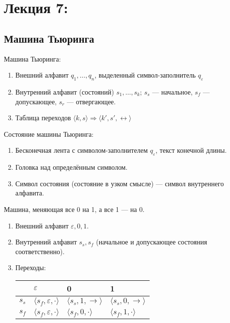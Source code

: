 \section{Лекция 7:}

\subsection{Машина Тьюринга}

 Машина Тьюринга:
\begin{enumerate}
\item Внешний алфавит $q_1, \dots, q_n$, выделенный символ-заполнитель $q_\varepsilon$
\item Внутренний алфавит (состояний) $s_1, \dots, s_k$; $s_s$ --- начальное, $s_f$ --- допускающее, $s_r$ --- отвергающее.
\item Таблица переходов $\langle k, s \rangle \Rightarrow \langle k', s', \leftrightarrow \rangle$
\end{enumerate}

 Состояние машины Тьюринга:
\begin{enumerate}
\item Бесконечная лента с символом-заполнителем $q_\varepsilon$, текст конечной длины.
\item Головка над определённым символом.
\item Символ состояния (состояние в узком смысле) --- символ внутреннего алфавита.
\end{enumerate}

Машина, меняющая все 0 на 1, а все 1 --- на 0.
\begin{enumerate}
\item Внешний алфавит $\varepsilon, 0, 1$.
\item Внутренний алфавит $s_s, s_f$ (начальное и допускающее состояния соответственно).
\item Переходы:
\begin{center}
\begin{tabular}{l|lll}
    & $\varepsilon$ & 0 & 1\\\hline
$s_s$ & $\langle s_f,\varepsilon,\cdot\rangle$ & $\langle s_s,1,\rightarrow\rangle$ & $\langle s_s,0,\rightarrow\rangle$\\
$s_f$ & $\langle s_f,\varepsilon,\cdot\rangle$ & $\langle s_f,0,\cdot\rangle$ & $\langle s_f,1,\cdot\rangle$
\end{tabular}\end{center}
\end{enumerate}

